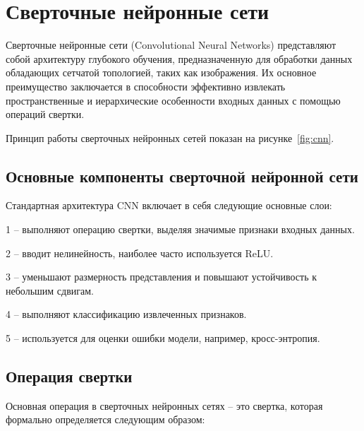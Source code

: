 \section{Сверточные нейронные сети}
\hspace*{12.5 mm}
Сверточные нейронные сети (Convolutional Neural Networks) представляют собой 
архитектуру глубокого обучения, предназначенную для обработки данных обладающих 
сетчатой топологией, таких как изображения. Их основное преимущество 
заключается в способности эффективно извлекать пространственные и иерархические 
особенности входных данных с помощью операций свертки.

Принцип работы сверточных нейронных сетей показан на рисунке~\ref{fig:cnn}\cite{CNN}.


\subsection{Основные компоненты сверточной нейронной сети}
\hspace*{12.5 mm}Стандартная архитектура CNN включает в себя следующие основные 
слои:

    1  – выполняют операцию свертки, выделяя значимые 
признаки входных данных.

    2  – вводит нелинейность, наиболее часто 
используется ReLU.\@

    3  – уменьшают размерность представления и 
повышают устойчивость к небольшим сдвигам.

    4  – выполняют классификацию извлеченных признаков.

    5  – используется для оценки ошибки модели, например, 
кросс-энтропия.

\subsection{Операция свертки}
\hspace*{12.5 mm}Основная операция в сверточных нейронных сетях – это свертка, 
которая формально определяется следующим образом:

